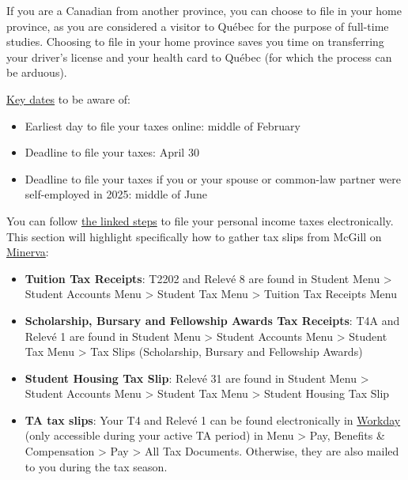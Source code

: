 If you are a Canadian from another province, you can choose to file in your home province, as you are considered a visitor to Québec for the purpose of full-time studies. Choosing to file in your home province saves you time on transferring your driver's license and your health card to Québec (for which the process can be arduous).  

\begin{plainexercise}
    \href{https://www.canada.ca/en/revenue-agency/services/tax/individuals/topics/important-dates-individuals.html}{Key dates} to be aware of:
\begin{itemize}
    \item Earliest day to file your taxes online: middle of February
    \item Deadline to file your taxes: April 30
    \item Deadline to file your taxes if you or your spouse or common-law partner were self-employed in 2025: middle of June
\end{itemize}\vspace{-15pt}
\end{plainexercise}

You can follow \href{https://www.canada.ca/en/services/taxes/income-tax/personal-income-tax/how-file/tax-software/complete-return.html}{the linked steps} to file your personal income taxes electronically. This section will highlight specifically how to gather tax slips from McGill on \href{https://horizon.mcgill.ca/pban1/twbkwbis.P_WWWLogin}{Minerva}:
\begin{itemize}
    \item \textbf{Tuition Tax Receipts}: T2202 and Relevé 8 are found in Student Menu >  Student Accounts Menu > Student Tax Menu > Tuition Tax Receipts Menu 
    \item \textbf{Scholarship, Bursary and Fellowship Awards Tax Receipts}: T4A and Relevé 1 are found in Student Menu >  Student Accounts Menu > Student Tax Menu > Tax Slips (Scholarship, Bursary and Fellowship Awards) 
    \item  \textbf{Student Housing Tax Slip}: Relevé 31 are found in Student Menu >  Student Accounts Menu > Student Tax Menu > Student Housing Tax Slip
    \item \textbf{TA tax slips}: Your T4 and Relevé 1 can be found electronically in \href{https://wd3.myworkday.com/mcgill/d/home.htmld}{Workday} (only accessible during your active TA period) in Menu > Pay, Benefits \& Compensation > Pay > All Tax Documents. Otherwise, they are also mailed to you during the tax season.
\end{itemize}

